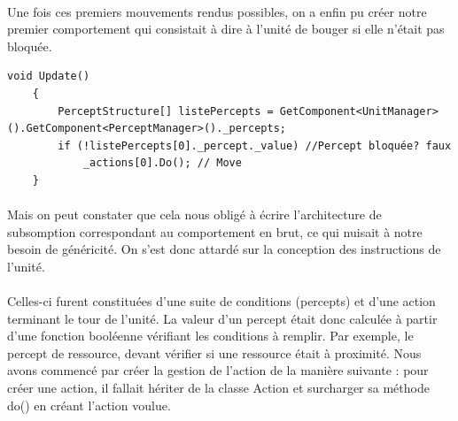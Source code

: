 \documentclass{report}
\begin{document}
\paragraph{}
Une fois ces premiers mouvements rendus possibles, on a enfin pu créer notre premier comportement qui consistait à dire à l'unité de bouger si elle n'était pas bloquée.
\begin{lstlisting}[language={[Sharp]C},label={lst:unitScript}, caption=  Extrait du code du script Brain.cs première version.]
    void Update()
    {
        PerceptStructure[] listePercepts = GetComponent<UnitManager>().GetComponent<PerceptManager>()._percepts;
        if (!listePercepts[0]._percept._value) //Percept bloquée? faux
            _actions[0].Do(); // Move
    }

\end{lstlisting}
\paragraph{}
Mais on peut constater que cela nous obligé à écrire l'architecture de subsomption correspondant au comportement en brut, ce qui nuisait à notre besoin de généricité. On s'est donc attardé sur la conception des instructions de l'unité. 
\paragraph{}
Celles-ci furent constituées d'une suite de conditions (percepts) et d'une action terminant le tour de l'unité. La valeur d'un percept était donc calculée à partir d'une fonction booléenne vérifiant les conditions à remplir. Par exemple, le percept de ressource, devant vérifier si une ressource était à proximité. Nous avons commencé par créer la gestion de l'action de la manière suivante : pour créer une action, il fallait hériter de la classe Action et surcharger sa méthode do() en créant l'action voulue.
\end{document}
